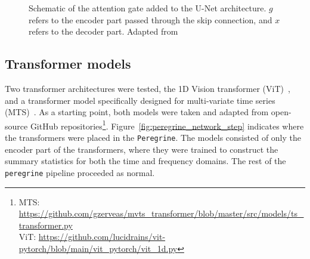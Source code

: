 \begin{figure}[htb]
\centering
{}
\caption{Schematic of the attention gate added to the U-Net architecture. $g$ refers to the encoder part passed through the skip connection, and $x$ refers to the decoder part. Adapted from~\cite{Oktay_2018_AUNet}}
\label{fig:attention_gate}
\end{figure}

\subsection{Transformer models}

Two transformer architectures were tested, the 1D Vision transformer (ViT)~\cite{Dosovitskiy_2021_ViT}, and a transformer model specifically designed for multi-variate time series (MTS)~\cite{Zerveas_2020_mvts}. As a starting point, both models were taken and adapted from open-source GitHub repositories\footnote{MTS: \url{https://github.com/gzerveas/mvts_transformer/blob/master/src/models/ts_transformer.py}\\
ViT: \url{https://github.com/lucidrains/vit-pytorch/blob/main/vit_pytorch/vit_1d.py}}. Figure~\ref{fig:peregrine_network_step} indicates where the transformers were placed in the \texttt{Peregrine}. The models consisted of only the encoder part of the transformers, where they were trained to construct the summary statistics for both the time and frequency domains. The rest of the \texttt{peregrine} pipeline proceeded as normal. 

